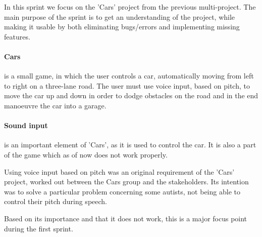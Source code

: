 In this sprint we focus on the 'Cars' project from the previous multi-project.
The main purpose of the sprint is to get an understanding of the project, while making it usable by both eliminating bugs/errors and implementing missing features.

\paragraph{Cars} is a small game, in which the user controls a car, automatically moving from left to right on a three-lane road.
The user must use voice input, based on pitch, to move the car up and down in order to dodge obstacles on the road and in the end manoeuvre the car into a garage.

\paragraph{Sound input} is an important element of 'Cars', as it is used to control the car.
It is also a part of the game which as of now does not work properly.

Using voice input based on pitch was an original requirement of the 'Cars' project, worked out between the Cars group and the stakeholders.
Its intention was to solve a particular problem concerning some autists, not being able to control their pitch during speech.

Based on its importance and that it does not work, this is a major focus point during the first sprint.